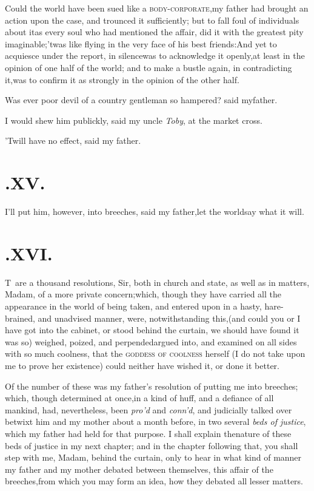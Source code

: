 \documentclass{article}
\begin{document}
\newpage
Could the world have been sued like a
\textsc{body-corporate},\tsk my father had brought an
action upon the case, and trounced it sufficiently; but to fall
foul of individuals about it\tsh as every soul who had
mentioned the affair, did it with the greatest pity
imaginable;\tsh ’twas like flying in the very face
of his best friends:\tsh And yet to acquiesce under the
report, in silence\tsk was to acknowledge it openly,\tsk at
least in the opinion of one half of the world; and to make a bustle
again, in contradicting it,\tsk was to confirm it as strongly in
the opinion of the other half.\tsh

\tsh Was ever poor devil of a country gentleman so
hampered? said my\break father.

\newpage
I would shew him publickly, said my uncle \textit{Toby}, at the
market cross.

\tsh ’Twill have no effect, said my father.

\section{.\enspace XV.}

\tsh I’ll put him, however, into\break
breeches, said my father,\tsk let the world\break say what it will.

\section{.\enspace XVI.}

\lettrine{T}{\,} are a thousand resolutions,\break
Sir, both in church and state, as well as in matters, Madam, of a
more private concern;\tsk which, though they have carried all the
appearance in the world of being taken, and entered upon in a
hasty, hare-brained, and unadvised manner, were, notwithstanding
this,\pb (and could you or I have got into the cabinet, or stood
behind the curtain, we should have found it was so) weighed,
poized, and perpended\tsh argued
 into, and
examined on all sides with so much coolness, that the
\textsc{goddess of coolness} herself (I do not take upon me
to prove her existence) could neither have wished it, or done it
better.

Of the number of these was my father’s resolution of
putting me into breeches; which, though determined at
once,\tsk in a kind of huff, and a defiance of all mankind, had,
nevertheless, been \textit{pro’d} and \textit{conn’d}, and
judicially talked over betwixt him and my mother about a month
before, in two several \textit{beds of justice}, which my father had
held for that purpose. I shall explain the\pb nature of these beds of
justice in my next chapter; and in the chapter following that, you
shall step with me, Madam, behind the curtain, only to hear in what
kind of manner my father and my mother debated between themselves,
this affair of the breeches,\tsk from which you may form an idea,
how they debated all lesser matters.
\end{document}
